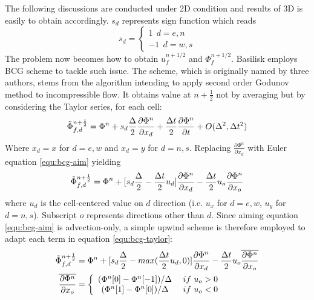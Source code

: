 The following discussions are conducted under 2D condition and results of 3D is easily to obtain accordingly. $s_d$ represents sign function which reads
\begin{equation}
    s_d = 
    \left\{
    \begin{array}{cc}
    1\ \ d=e,n \\
    -1\ \ d=w,s
    \end{array}
    \right.
\end{equation}
The problem now becomes how to obtain $u_f^{n+1/2}$ and $\Phi_f^{n+1/2}$. Basilisk employs BCG scheme to tackle such issue. The scheme, which is originally named by three authors\cite{1989_Bell}, stems from the algorithm intending to apply second order Godunov method to incompressible flow. It obtains value at $n+\frac{1}{2}$ not by averaging but by considering the Taylor series, for each cell:
\begin{equation}
  \Tilde{\Phi}^{n+ \frac{1}{2}}_{f,d} = \Phi^n+ s_d\frac{\Delta}{2} \frac{\partial \Phi^n}{\partial x_d} + \frac{\Delta t}{2} \frac{\partial \Phi^n}{\partial t} + O(\Delta^2,\Delta t^2)
\end{equation}
Where $x_d=x$ for $d = e,w$ and $x_d=y$ for $d = n,s$. Replacing $ \frac{\partial \Phi^n}{\partial x_d}$ with Euler equation \ref{equ:bcg-aim} yielding 
\begin{equation}
  \Tilde{\Phi}^{n+ \frac{1}{2}}_{f,d} = \Phi^n + [s_d \frac{\Delta}{2}- \frac{\Delta t}{2} u_d] \frac{\partial \Phi^n}{\partial x_d} - \frac{\Delta t}{2} u_o \frac{\partial \Phi^n}{\partial x_o}\label{equ:bcg-taylor}
\end{equation}
where $u_d$ is the cell-centered value on $d$ direction (i.e. $u_x$ for $d = e,w$, $u_y$ for $d = n,s$). Subscript $o$ represents directions other than $d$.
Since aiming equation \ref{equ:bcg-aim} is advection-only, a simple upwind scheme is therefore employed\cite{2000_Martin,1998_Martin} to adapt each term in equation \ref{equ:bcg-taylor}:
\begin{align}
  \Tilde{\Phi}^{n+ \frac{1}{2}}_{f,d} &= \Phi^n + [s_d \frac{\Delta}{2}- max(\frac{\Delta t}{2} u_d,0)] \frac{\partial \Phi^n}{\partial x_d} - \frac{\Delta t}{2} u_o \overline{\frac{\partial \Phi^n}{\partial x_o}}\label{equ:bcg-upwind} \\
  \overline{\frac{\partial \Phi^n}{\partial x_o}} &= \left\{
  \begin{array}{cc}
       (\Phi^n[0] - \Phi^n[-1])/\Delta&\ if\ u_o>0 \\
       (\Phi^n[1] - \Phi^n[0])/\Delta&\ if\ u_o<0
  \end{array}
  \right.\label{equ:bcg-upwind2}
\end{align}
